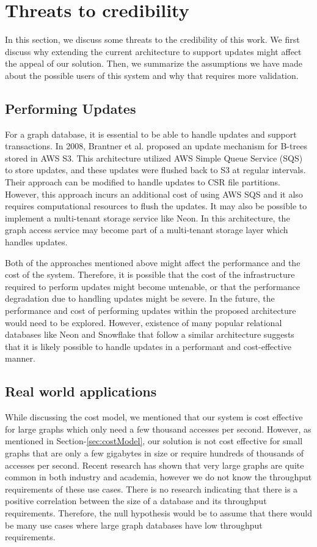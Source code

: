 \section{Threats to credibility}\label{sec:threats}
In this section, we discuss some threats to the credibility of this work. We
first discuss why extending the current architecture to support updates might
affect the appeal of our solution. Then, we summarize the assumptions we have
made about the possible users of this system and why that requires more
validation. 

\subsection{Performing Updates}
For a graph database, it is essential to be able to handle updates and support
transactions. In 2008, Brantner et al.\cite{brantner2008building} proposed an
update mechanism for B-trees stored in AWS S3. This architecture utilized AWS
Simple Queue Service (SQS) to store updates, and these updates were flushed back
to S3 at regular intervals. Their approach can be modified to handle updates to
CSR file partitions. However, this approach incurs an additional cost of using
AWS SQS and it also requires computational resources to flush the updates. It
may also be possible to implement a multi-tenant storage service like
Neon\cite{neonPostgres}. In this architecture, the graph access service may
become part of a multi-tenant storage layer which handles updates.

Both of the approaches mentioned above might affect the performance and the cost
of the system. Therefore, it is possible that the cost of the infrastructure
required to perform updates might become untenable, or that the performance
degradation due to handling updates might be severe. In the future, the
performance and cost of performing updates within the proposed architecture
would need to be explored. However, existence of many popular relational
databases like Neon\cite{neonPostgres} and Snowflake\cite{snowflake} that follow
a similar architecture suggests that it is likely possible to handle updates in
a performant and cost-effective manner.

\subsection{Real world applications}
While discussing the cost model, we mentioned that our system is cost effective
for large graphs which only need a few thousand accesses per second. However, as
mentioned in Section-\ref{sec:costModel}, our solution is not cost effective for
small graphs that are only a few gigabytes in size or require hundreds of
thousands of accesses per second. Recent research has shown that very large
graphs are quite common in both industry and academia\cite{sahu2017ubiquity},
however we do not know the throughput requirements of these use cases. There is
no research indicating that there is a positive correlation between the size of
a database and its throughput requirements. Therefore, the null hypothesis would
be to assume that there would be many use cases where large graph databases have
low throughput requirements.

